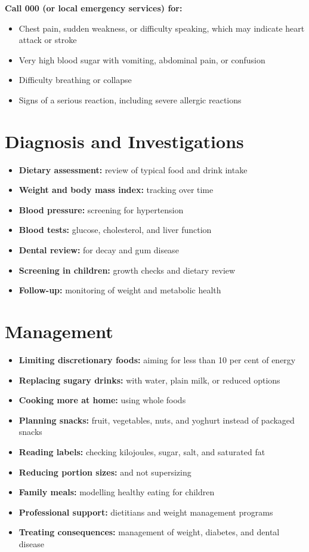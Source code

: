 \textbf{Call 000 (or local emergency services) for:}
\begin{itemize}
    \item Chest pain, sudden weakness, or difficulty speaking, which may indicate heart attack or stroke
    \item Very high blood sugar with vomiting, abdominal pain, or confusion
    \item Difficulty breathing or collapse
    \item Signs of a serious reaction, including severe allergic reactions
\end{itemize}

\section*{Diagnosis and Investigations}
\begin{itemize}
    \item \textbf{Dietary assessment:} review of typical food and drink intake
    \item \textbf{Weight and body mass index:} tracking over time
    \item \textbf{Blood pressure:} screening for hypertension
    \item \textbf{Blood tests:} glucose, cholesterol, and liver function
    \item \textbf{Dental review:} for decay and gum disease
    \item \textbf{Screening in children:} growth checks and dietary review
    \item \textbf{Follow-up:} monitoring of weight and metabolic health
\end{itemize}

\section*{Management}
\begin{itemize}
    \item \textbf{Limiting discretionary foods:} aiming for less than 10 per cent of energy
    \item \textbf{Replacing sugary drinks:} with water, plain milk, or reduced options
    \item \textbf{Cooking more at home:} using whole foods
    \item \textbf{Planning snacks:} fruit, vegetables, nuts, and yoghurt instead of packaged snacks
    \item \textbf{Reading labels:} checking kilojoules, sugar, salt, and saturated fat
    \item \textbf{Reducing portion sizes:} and not supersizing
    \item \textbf{Family meals:} modelling healthy eating for children
    \item \textbf{Professional support:} dietitians and weight management programs
    \item \textbf{Treating consequences:} management of weight, diabetes, and dental disease
\end{itemize}


